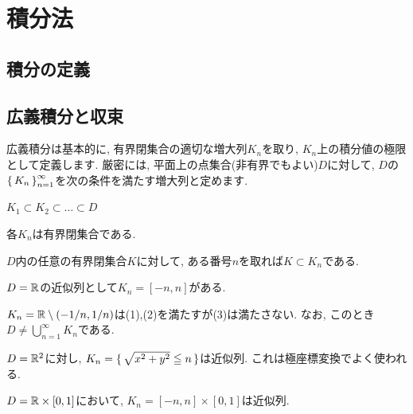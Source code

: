 \section{積分法}
\subsection{積分の定義}





\subsection{広義積分と収束}
広義積分は基本的に, 有界閉集合の適切な増大列$K_n$を取り, $K_n$上の積分値の極限として定義します. 厳密には, 平面上の点集合(非有界でもよい)$D$に対して, $D$の$\set{K_n}_{n=1}^{\infty}$を次の条件を満たす増大列と定めます.
\ben
\item $K_1\subset K_2\subset \dots \subset D$
\item 各$K_n$は有界閉集合である.
\item $D$内の任意の有界閉集合$K$に対して, ある番号$n$を取れば$K\subset K_n$である.
\een

\begin{eg}
\ben
\item $D=\mathbb{R}$の近似列として$K_n = [-n,n]$がある.
\item $K_n = \mathbb{R} \setminus{(-1/n, 1/n)}$は(1),(2)を満たすが(3)は満たさない. なお, このとき$D\neq \bigcup_{n=1}^{\infty} K_n$である.
\item $D=\mathbb{R}^2$に対し, $K_n = \set{\sqrt{x^2+y^2}\leqq n}$は近似列. これは極座標変換でよく使われる.
\item $D = \mathbb{R}\times [0,1]$において, $K_n = [-n,n]\times [0,1]$は近似列.
\een
\end{eg}

